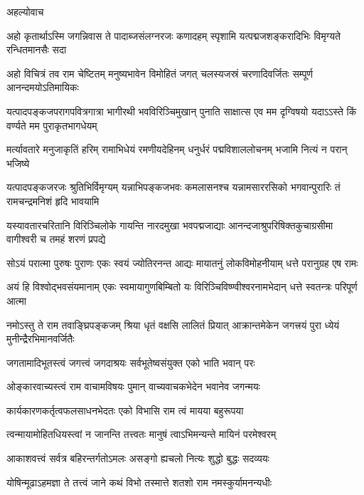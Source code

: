 \centerline{अहल्योवाच}

\fourlineindentedshloka
{अहो कृतार्थाऽस्मि जगन्निवास ते}
{पादाब्जसंलग्नरजः कणादहम्}
{स्पृशामि यत्पद्मजशङ्करादिभिः}
{विमृग्यते रन्धितमानसैः सदा}%

\fourlineindentedshloka
{अहो विचित्रं तव राम चेष्टितम्}
{मनुष्यभावेन विमोहितं जगत्}
{चलस्यजस्रं चरणादिवर्जितः}
{सम्पूर्ण आनन्दमयोऽतिमायिकः}%

\fourlineindentedshloka
{यत्पादपङ्कजपरागपवित्रगात्रा}
{भागीरथी भवविरिञ्चिमुखान्  पुनाति}
{साक्षात्स एव मम दृग्विषयो यदाऽऽस्ते}
{किं वर्ण्यते मम पुराकृतभागधेयम्}%

\fourlineindentedshloka
{मर्त्यावतारे मनुजाकृतिं हरिम्}
{रामाभिधेयं रमणीयदेहिनम्}
{धनुर्धरं पद्मविशाललोचनम्}
{भजामि नित्यं न परान्  भजिष्ये}%

\fourlineindentedshloka
{यत्पादपङ्कजरजः श्रुतिभिर्विमृग्यम्}
{यन्नाभिपङ्कजभवः कमलासनश्च}
{यन्नामसाररसिको भगवान्पुरारिः}
{तं  रामचन्द्रमनिशं हृदि भावयामि}%

\fourlineindentedshloka
{यस्यावतारचरितानि विरिञ्चिलोके}
{गायन्ति नारदमुखा भवपद्मजाद्याः}
{आनन्दजाश्रुपरिषिक्तकुचाग्रसीमा}
{वागीश्वरी च तमहं शरणं प्रपद्ये}%

\fourlineindentedshloka
{सोऽयं परात्मा पुरुषः पुराणः}
{एकः स्वयं ज्योतिरनन्त आद्यः}
{मायातनुं लोकविमोहनीयाम्}
{धत्ते परानुग्रह एष रामः}%

\fourlineindentedshloka
{अयं हि विश्वोद्भवसंयमानाम्}
{एकः  स्वमायागुणबिम्बितो यः}
{विरिञ्चिविष्ण्वीश्वरनामभेदान्}
{धत्ते स्वतन्त्रः परिपूर्ण आत्मा}%

\fourlineindentedshloka
{नमोऽस्तु ते राम तवाङ्घ्रिपङ्कजम्}
{श्रिया धृतं वक्षसि लालितं प्रियात्}
{आक्रान्तमेकेन जगत्त्रयं पुरा}
{ध्येयं मुनीन्द्रैरभिमानवर्जितैः}%

\twolineshloka
{जगतामादिभूतस्त्वं जगत्त्वं जगदाश्रयः}
{सर्वभूतेष्वसंयुक्त एको भाति भवान् परः}%

\twolineshloka
{ओङ्कारवाच्यस्त्वं राम वाचामविषयः पुमान्}
{वाच्यवाचकभेदेन भवानेव जगन्मयः}%

\twolineshloka
{कार्यकारणकर्तृत्वफलसाधनभेदतः}
{एको विभासि राम त्वं मायया बहुरूपया}%

\twolineshloka
{त्वन्मायामोहितधियस्त्वां न जानन्ति तत्त्वतः}
{मानुषं त्वाऽभिमन्यन्ते मायिनं परमेश्वरम्}%

\twolineshloka
{आकाशवत्त्वं सर्वत्र बहिरन्तर्गतोऽमलः}
{असङ्गो ह्यचलो नित्यः शुद्धो बुद्धः सदव्ययः}%

\twolineshloka
{योषिन्मूढाऽहमज्ञा ते तत्त्वं जाने कथं विभो}
{तस्मात्ते शतशो राम नमस्कुर्यामनन्यधीः}%

